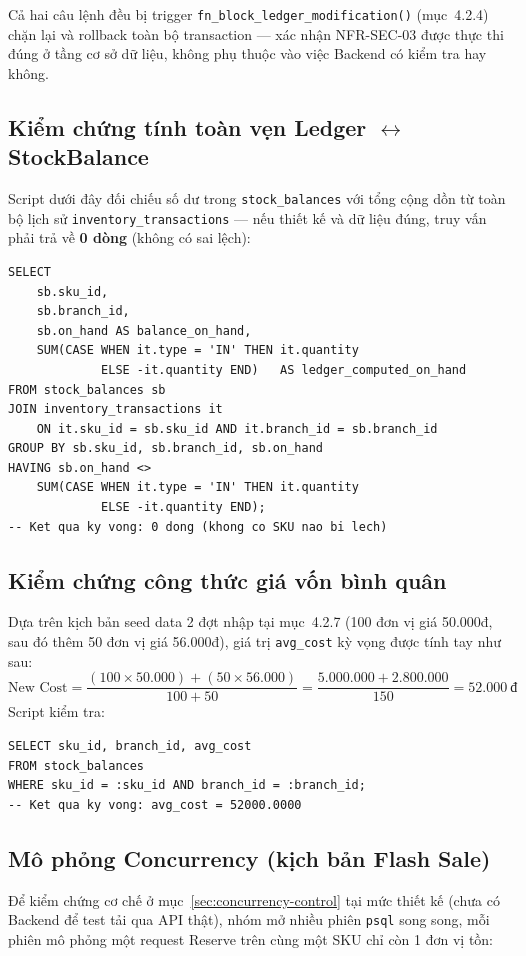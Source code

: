 Cả hai câu lệnh đều bị trigger \texttt{fn\_block\_ledger\_modification()} (mục~4.2.4) chặn lại và rollback toàn bộ transaction — xác nhận NFR-SEC-03 được thực thi đúng ở tầng cơ sở dữ liệu, không phụ thuộc vào việc Backend có kiểm tra hay không.

\subsection{Kiểm chứng tính toàn vẹn Ledger $\leftrightarrow$ StockBalance}
Script dưới đây đối chiếu số dư trong \texttt{stock\_balances} với tổng cộng dồn từ toàn bộ lịch sử \texttt{inventory\_transactions} — nếu thiết kế và dữ liệu đúng, truy vấn phải trả về \textbf{0 dòng} (không có sai lệch):

\begin{lstlisting}
SELECT
    sb.sku_id,
    sb.branch_id,
    sb.on_hand AS balance_on_hand,
    SUM(CASE WHEN it.type = 'IN' THEN it.quantity
             ELSE -it.quantity END)   AS ledger_computed_on_hand
FROM stock_balances sb
JOIN inventory_transactions it
    ON it.sku_id = sb.sku_id AND it.branch_id = sb.branch_id
GROUP BY sb.sku_id, sb.branch_id, sb.on_hand
HAVING sb.on_hand <>
    SUM(CASE WHEN it.type = 'IN' THEN it.quantity
             ELSE -it.quantity END);
-- Ket qua ky vong: 0 dong (khong co SKU nao bi lech)
\end{lstlisting}

\subsection{Kiểm chứng công thức giá vốn bình quân}
Dựa trên kịch bản seed data 2 đợt nhập tại mục~4.2.7 (100 đơn vị giá 50.000đ, sau đó thêm 50 đơn vị giá 56.000đ), giá trị \texttt{avg\_cost} kỳ vọng được tính tay như sau:
\[
\text{New Cost} = \frac{(100 \times 50.000) + (50 \times 56.000)}{100 + 50} = \frac{5.000.000 + 2.800.000}{150} = 52.000\ \text{đ}
\]
Script kiểm tra:
\begin{lstlisting}
SELECT sku_id, branch_id, avg_cost
FROM stock_balances
WHERE sku_id = :sku_id AND branch_id = :branch_id;
-- Ket qua ky vong: avg_cost = 52000.0000
\end{lstlisting}

\subsection{Mô phỏng Concurrency (kịch bản Flash Sale)}
\label{sec:concurrency-test}
Để kiểm chứng cơ chế ở mục~\ref{sec:concurrency-control} tại mức thiết kế (chưa có Backend để test tải qua API thật), nhóm mở nhiều phiên \texttt{psql} song song, mỗi phiên mô phỏng một request Reserve trên cùng một SKU chỉ còn 1 đơn vị tồn:

